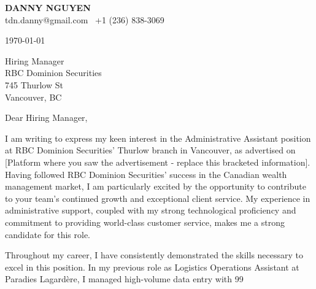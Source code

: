 \documentclass[letterpaper,11pt]{article}
\begin{document}
\textbf{DANNY NGUYEN} \\
tdn.danny@gmail.com \textbullet\ +1 (236) 838-3069 \\
\vspace{20pt}

\today \\
\vspace{20pt}

Hiring Manager \\
RBC Dominion Securities \\
745 Thurlow St \\
Vancouver, BC \\
\vspace{20pt}

Dear Hiring Manager, \\
\vspace{10pt}

I am writing to express my keen interest in the Administrative Assistant position at RBC Dominion Securities' Thurlow branch in Vancouver, as advertised on [Platform where you saw the advertisement -  replace this bracketed information].  Having followed RBC Dominion Securities' success in the Canadian wealth management market, I am particularly excited by the opportunity to contribute to your team's continued growth and exceptional client service. My experience in administrative support, coupled with my strong technological proficiency and commitment to providing world-class customer service, makes me a strong candidate for this role.


\vspace{10pt}

Throughout my career, I have consistently demonstrated the skills necessary to excel in this position. In my previous role as Logistics Operations Assistant at Paradies Lagardère, I managed high-volume data entry with 99%
\end{document}
